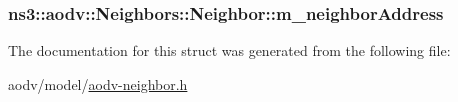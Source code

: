 \subsubsection[{\texorpdfstring{m\+\_\+neighbor\+Address}{m_neighborAddress}}]{ ns3\+::aodv\+::\+Neighbors\+::\+Neighbor\+::m\+\_\+neighbor\+Address}\hypertarget{structns3_1_1aodv_1_1Neighbors_1_1Neighbor_af59d289e315ff65bfe53bab8bfba406a}{}\label{structns3_1_1aodv_1_1Neighbors_1_1Neighbor_af59d289e315ff65bfe53bab8bfba406a}


The documentation for this struct was generated from the following file\+:\begin{DoxyCompactItemize}
\item 
aodv/model/\hyperlink{aodv-neighbor_8h}{aodv-\/neighbor.\+h}\end{DoxyCompactItemize}
